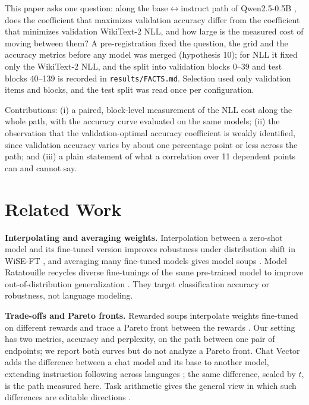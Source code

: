 \documentclass[conference]{IEEEtran}
\begin{document}
This paper asks one question: along the base$\leftrightarrow$instruct path of Qwen2.5-0.5B \cite{qwen25}, does the coefficient that maximizes validation accuracy differ from the coefficient that minimizes validation WikiText-2 NLL, and how large is the measured cost of moving between them? A pre-registration fixed the question, the grid and the accuracy metrics before any model was merged (hypothesis 10); for NLL it fixed only the WikiText-2 NLL, and the split into validation blocks 0--39 and test blocks 40--139 is recorded in \texttt{results/FACTS.md}. Selection used only validation items and blocks, and the test split was read once per configuration.

Contributions: (i) a paired, block-level measurement of the NLL cost along the whole path, with the accuracy curve evaluated on the same models; (ii) the observation that the validation-optimal accuracy coefficient is weakly identified, since validation accuracy varies by about one percentage point or less across the path; and (iii) a plain statement of what a correlation over 11 dependent points can and cannot say.

\section{Related Work}
\textbf{Interpolating and averaging weights.} Interpolation between a zero-shot model and its fine-tuned version improves robustness under distribution shift in WiSE-FT \cite{wortsman2021wiseft}, and averaging many fine-tuned models gives model soups \cite{wortsman2022soups}. Model Ratatouille recycles diverse fine-tunings of the same pre-trained model to improve out-of-distribution generalization \cite{rame2022ratatouille}. They target classification accuracy or robustness, not language modeling.

\textbf{Trade-offs and Pareto fronts.} Rewarded soups interpolate weights fine-tuned on different rewards and trace a Pareto front between the rewards \cite{rame2023rewardedsoups}. Our setting has two metrics, accuracy and perplexity, on the path between one pair of endpoints; we report both curves but do not analyze a Pareto front. Chat Vector adds the difference between a chat model and its base to another model, extending instruction following across languages \cite{huang2023chatvector}; the same difference, scaled by $t$, is the path measured here. Task arithmetic gives the general view in which such differences are editable directions \cite{ilharco2022taskarith,ortizjimenez2023tangent}.
\end{document}
